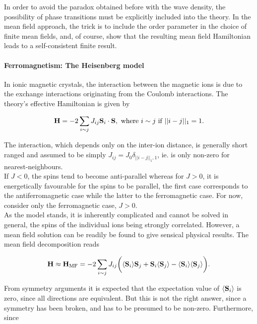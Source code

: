 \documentclass{homework}
\begin{document}
In order to avoid the paradox obtained before with the wave density, the possibility of phase transitions must be explicitly included into the theory. In the mean field approach, the trick is to include the order parameter in the choice of finite mean fields, and, of course, show that the resulting mean field Hamiltonian leads to a self-consistent finite result. \\

\paragraph{\textbf{Ferromagnetism: The Heisenberg model}}

In ionic magnetic crystals, the interaction between the magnetic ions is due to the exchange interactions originating from the Coulomb interactions. The theory's effective Hamiltonian is given by 

\begin{equation}
    {\bf H} = - 2 \sum_{i \sim j} J_{ij} {{\bf S}}_i \cdot {\bf S}, \textnormal{ where } i \sim j \textnormal{ if } ||i-j||_1 = 1.
\end{equation}

The interaction, which depends only on the inter-ion distance, is generally short ranged and assumed to be simply $J_{ij} = J_0 \delta_{||i-j||_1, 1}$, ie. is only non-zero for nearest-neighbours. \\

If $J<0$, the spins tend to become anti-parallel whereas for $J>0$, it is energetically favourable for the spins to be parallel, the first case corresponds to the antiferromagnetic case while the latter to the ferromagnetic case. For now, consider only the ferromagnetic case, $J > 0$. \\

As the model stands, it is inherently complicated and cannot be solved in general, the spins of the individual ions being strongly correlated. However, a mean field solution can be readily be found to give sensical physical results. The mean field decomposition reads

\begin{equation}
    {\bf H} \approx {\bf H}_{\textnormal{MF}} = -2 \sum_{i \sim j} J_{ij} \bigg( \langle {\bf S}_i \rangle {\bf S}_j + {\bf S}_i\langle {\bf S}_j \rangle - \langle {\bf S}_i \rangle \langle {\bf S}_j \rangle \bigg).
\end{equation}

From symmetry arguments it is expected that the expectation value of $\langle {\bf S}_i \rangle$ is zero, since all directions are equivalent. But this is not the right answer, since a symmetry has been broken, and has to be presumed to be non-zero. Furthermore, since 
\end{document}

